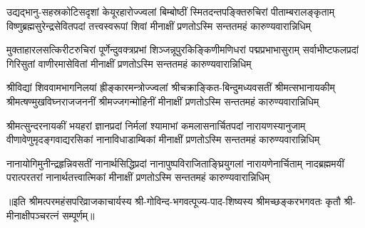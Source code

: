 

\fourlineindentedshloka
{उद्यद्भानु-सहस्रकोटिसदृशां केयूरहारोज्ज्वलां}
{बिम्बोष्ठीं स्मितदन्तपङ्क्तिरुचिरां पीताम्बरालङ्कृताम्}
{विष्णुब्रह्मसुरेन्द्रसेवितपदां तत्त्वस्वरूपां शिवां}
{मीनाक्षीं प्रणतोऽस्मि सन्ततमहं कारुण्यवारान्निधिम्}%

\fourlineindentedshloka
{मुक्ताहारलसत्किरीटरुचिरां पूर्णेन्दुवक्त्रप्रभां}
{शिञ्जन्नूपुरकिङ्किणीमणिधरां पद्मप्रभाभासुराम्}
{सर्वाभीष्टफलप्रदां गिरिसुतां वाणीरमासेवितां}
{मीनाक्षीं प्रणतोऽस्मि सन्ततमहं कारुण्यवारान्निधिम्}%

\fourlineindentedshloka
{श्रीविद्यां शिववामभागनिलयां ह्रीङ्कारमन्त्रोज्ज्वलां}
{श्रीचक्राङ्कित-बिन्दुमध्यवसतीं श्रीमत्सभानायकीम्}
{श्रीमत्षण्मुखविघ्नराजजननीं श्रीमज्जगन्मोहिनीं}
{मीनाक्षीं प्रणतोऽस्मि सन्ततमहं कारुण्यवारान्निधिम्}%

\fourlineindentedshloka
{श्रीमत्सुन्दरनायकीं भयहरां ज्ञानप्रदां निर्मलां}
{श्यामाभां कमलासनार्चितपदां नारायणस्यानुजाम्}
{वीणावेणुमृदङ्गवाद्यरसिकां नानाविधाडाम्बिकां}
{मीनाक्षीं प्रणतोऽस्मि सन्ततमहं कारुण्यवारान्निधिम्}%

\fourlineindentedshloka
{नानायोगिमुनीन्द्रहृन्निवसतीं नानार्थसिद्धिप्रदां}
{नानापुष्पविराजिताङ्घ्रियुगलां नारायणेनार्चिताम्}
{नादब्रह्ममयीं परात्परतरां नानार्थतत्त्वात्मिकां}
{मीनाक्षीं प्रणतोऽस्मि सन्ततमहं कारुण्यवारान्निधिम्}%

॥इति श्रीमत्परमहंसपरिव्राजकाचार्यस्य श्री-गोविन्द-भगवत्पूज्य-पाद-शिष्यस्य
श्रीमच्छङ्करभगवतः कृतौ श्री-मीनाक्षीपञ्चरत्नं सम्पूर्णम्॥